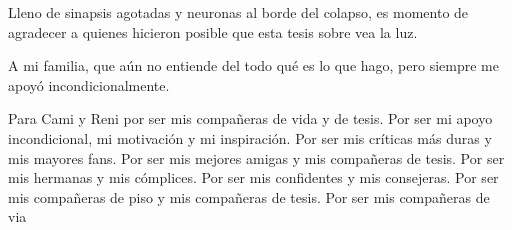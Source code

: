 \newpage
    \begin{center}
        Lleno de sinapsis agotadas y neuronas al borde del colapso, es momento de agradecer a quienes hicieron posible que esta tesis sobre vea la luz.

        A mi familia, que aún no entiende del todo qué es lo que hago, pero siempre me apoyó incondicionalmente. 

    \end{center}

\newpage
    \begin{center}
        Para Cami y Reni por ser mis compañeras de vida y de tesis. Por ser mi apoyo incondicional, mi motivación y mi inspiración. Por ser mis críticas más duras y mis mayores fans. Por ser mis mejores amigas y mis compañeras de tesis. Por ser mis hermanas y mis cómplices. Por ser mis confidentes y mis consejeras. Por ser mis compañeras de piso y mis compañeras de tesis. Por ser mis compañeras de via
    \end{center}

\newpage
\begin{center}
\end{center}

\tableofcontents

\newpage